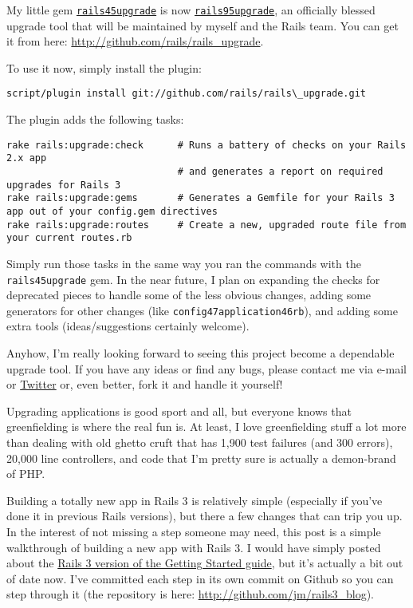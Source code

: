 \documentclass{book}
\begin{document}
My little gem \href{http://github.com/jm/rails-upgrade}{{\colorbox[rgb]{0.87,0.87,0.87}{\tt rails\char45upgrade}}} is now \href{http://github.com/rails/rails\_upgrade}{{\colorbox[rgb]{0.87,0.87,0.87}{\tt rails\char95upgrade}}}, an officially blessed upgrade tool that will be maintained by myself and the Rails team. You can get it from here: \href{http://github.com/rails/rails\_upgrade}{http://github.com/rails/rails\_upgrade}.

To use it now, simply install the plugin:

\begin{verbatim}script/plugin install git://github.com/rails/rails\_upgrade.git\end{verbatim}
The plugin adds the following tasks:

\begin{verbatim}rake rails:upgrade:check      # Runs a battery of checks on your Rails 2.x app
                              # and generates a report on required upgrades for Rails 3
rake rails:upgrade:gems       # Generates a Gemfile for your Rails 3 app out of your config.gem directives
rake rails:upgrade:routes     # Create a new, upgraded route file from your current routes.rb\end{verbatim}
Simply run those tasks in the same way you ran the commands with the {\colorbox[rgb]{0.87,0.87,0.87}{\tt rails\char45upgrade}} gem. In the near future, I plan on expanding the checks for deprecated pieces to handle some of the less obvious changes, adding some generators for other changes (like {\colorbox[rgb]{0.87,0.87,0.87}{\tt config\char47application\char46rb}}), and adding some extra tools (ideas/suggestions certainly welcome).

Anyhow, I'{}m really looking forward to seeing this project become a dependable upgrade tool. If you have any ideas or find any bugs, please contact me via e-mail or \href{http://twitter.com/jm}{Twitter} or, even better, fork it and handle it yourself!

Upgrading applications is good sport and all, but everyone knows that greenfielding is where the real fun is. At least, I love greenfielding stuff a lot more than dealing with old ghetto cruft that has 1,900 test failures (and 300 errors), 20,000 line controllers, and code that I'{}m pretty sure is actually a demon-brand of PHP.

Building a totally new app in Rails 3 is relatively simple (especially if you'{}ve done it in previous Rails versions), but there a few changes that can trip you up. In the interest of not missing a step someone may need, this post is a simple walkthrough of building a new app with Rails 3. I would have simply posted about the \href{http://guides.rails.info/getting_started.html}{Rails 3 version of the Getting Started guide}, but it'{}s actually a bit out of date now. I'{}ve committed each step in its own commit on Github so you can step through it (the repository is here: \href{http://github.com/jm/rails3_blog}{http://github.com/jm/rails3\_blog}).
\end{document}
